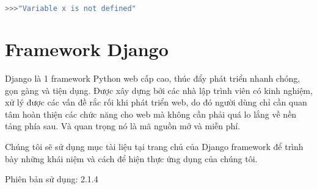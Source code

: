 \begin{itemize}
\begin{lstlisting}[language=Python]
>>>"Variable x is not defined"
	\end{lstlisting}
\end{itemize}
\section{Framework Django}
Django là 1 framework Python web cấp cao, thúc đẩy phát triển nhanh chóng, gọn gàng và tiện dụng. Được xây dựng bởi các nhà lập trình viên có kinh nghiệm, xử lý được các vấn đề rắc rối khi phát triển web, do đó người dùng chỉ cần quan tâm hoàn thiện các chức năng cho web mà không cần phải quá lo lắng về nền tảng phía sau. Và quan trọng nó là mã nguồn mở và miễn phí.
\par
Chúng tôi sẽ sử dụng mục tài liệu\cite{django} tại trang chủ của Django framework để trình bày những khái niệm và cách để hiện thực ứng dụng của chúng tôi.
\par
Phiên bản sử dụng: 2.1.4
